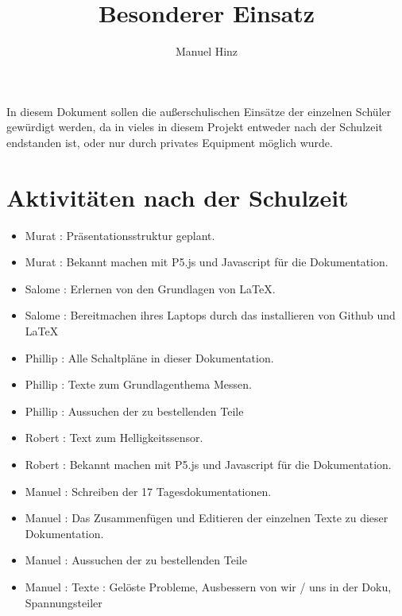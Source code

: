 \documentclass{article}
\author{Manuel Hinz}
\title{Besonderer Einsatz}
\begin{document}
\maketitle

In diesem Dokument sollen die au{\ss}erschulischen Eins\"{a}tze der einzelnen Sch\"{u}ler gew\"{u}rdigt werden, da in vieles in diesem Projekt entweder nach der Schulzeit endstanden ist, oder nur durch privates Equipment m\"{o}glich wurde.


\section{Aktivit\"{a}ten nach der Schulzeit}

\begin{itemize}

\item Murat : Pr\"{a}sentationsstruktur geplant.

\item Murat : Bekannt machen mit P5.js und Javascript f\"{u}r die Dokumentation.

\item Salome : Erlernen von den Grundlagen von \LaTeX .

\item Salome : Bereitmachen ihres Laptops durch das installieren  von Github und \LaTeX

\item Phillip : Alle Schaltpl\"{a}ne in dieser Dokumentation.

\item Phillip : Texte zum Grundlagenthema Messen.

\item Phillip : Aussuchen der zu bestellenden Teile

\item Robert : Text zum Helligkeitssensor.

\item Robert : Bekannt machen mit P5.js und Javascript f\"{u}r die Dokumentation.


\item Manuel : Schreiben der 17 Tagesdokumentationen.

\item Manuel : Das Zusammenf\"{u}gen und Editieren der einzelnen Texte zu dieser Dokumentation.

\item Manuel : Aussuchen der zu bestellenden Teile

\item Manuel : Texte :  Gel\"{o}ste Probleme, Ausbessern von wir / uns in der Doku, Spannungsteiler  

\end{itemize}
\end{document}
